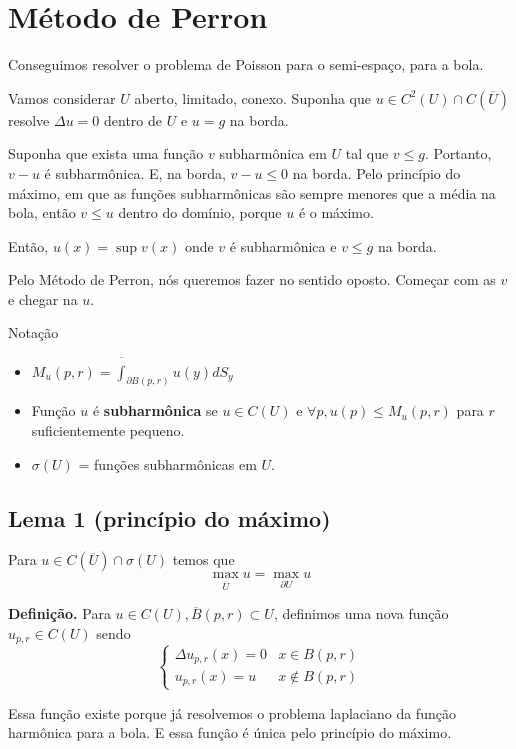 \documentclass[11pt]{article}
\newcommand{\p}{\partial}
\begin{document}
\section{Método de Perron}

Conseguimos resolver o problema de Poisson para o semi-espaço, para a bola. 

Vamos considerar \(U\) aberto, limitado, conexo. Suponha que \(u \in C^2 (U) \cap C(\overline{U})\) resolve \(\Delta u = 0\) dentro de \(U\) e \(u=g\) na borda.

Suponha que exista uma função \(v\) subharmônica em \(U\) tal que \(v \leq g\). Portanto, \(v - u\) é subharmônica. E, na borda, \(v-u\leq 0 \) na borda. Pelo princípio do máximo, em que as funções subharmônicas são sempre menores que a média na bola, então \(v \leq u\) dentro do domínio, porque \(u\) é o máximo.

Então, \(u(x) = \sup v(x)\) onde \(v\) é subharmônica e \(v \leq g\) na borda.

Pelo Método de Perron, nós queremos fazer no sentido oposto. Começar com as \(v\) e chegar na \(u\). 

Notação
\begin{itemize}
	\item \(M_u (p,r) = \overline{\int}_{\p B(p,r)} u(y) dS_y \)
	\item Função \(u\) é \textbf{subharmônica} se \(u \in C(U)\) e \(\forall p, u(p) \leq M_u (p,r)\) para \(r\) suficientemente pequeno.
	\item \(\sigma(U)\) = funções subharmônicas em \(U\).
\end{itemize} 

\subsection*{Lema 1 (princípio do máximo)}

Para \(u \in C(\overline{U}) \cap \sigma(U)\) temos que \[\max_{\overline{U}} u = \max_{\p U} u\]

\textbf{Definição. } Para \(u \in C(U), \overline{B}(p,r) \subset U\), definimos uma nova função \(u_{p,r} \in C(U)\) sendo \[\begin{cases}
	\Delta u_{p,r} (x) =0  & x \in B(p,r) \\
	u_{p,r}(x) = u & x \notin B(p,r)
\end{cases}\]

Essa função existe porque já resolvemos o problema laplaciano da função harmônica para a bola. E essa função é única pelo princípio do máximo.
\end{document}
